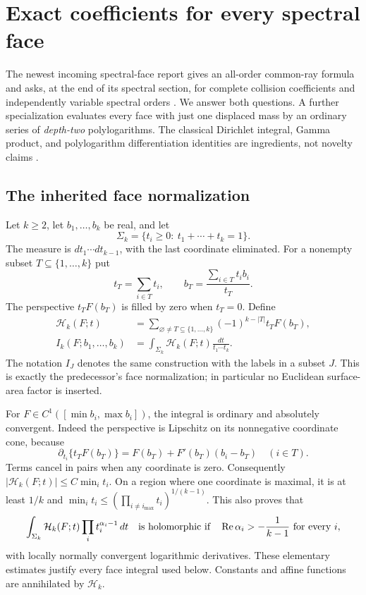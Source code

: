 \documentclass[11pt,letterpaper]{article}
\numberwithin{equation}{section}
\theoremstyle{definition}
\theoremstyle{remark}
\DeclareMathOperator{\Ree}{Re}
\begin{document}
\section{Exact coefficients for every spectral face}
\label{sfj:sec:faces}

The newest incoming spectral-face report gives an all-order common-ray
formula and asks, at the end of its spectral section, for complete
collision coefficients and independently variable spectral orders
\cite{RepoBernoulli}.  We answer both questions.  A further
specialization evaluates every face with just one displaced mass by
an ordinary series of \emph{depth-two} polylogarithms.  The classical
Dirichlet integral, Gamma product, and polylogarithm differentiation
identities are ingredients, not novelty claims
\cite{Carlson,DLMF}.

\subsection{The inherited face normalization}

Let $k\ge2$, let $b_1,\ldots,b_k$ be real, and let
\[
 \Sigma_k=\{t_i\ge0:\ t_1+\cdots+t_k=1\}.
\]
The measure is $dt_1\cdots dt_{k-1}$, with the last coordinate
eliminated.  For a nonempty subset $T\subseteq\{1,\ldots,k\}$ put
\[
 t_T=\sum_{i\in T}t_i,\qquad
 b_T=\frac{\sum_{i\in T}t_i b_i}{t_T}.
\]
The perspective $t_TF(b_T)$ is filled by zero when $t_T=0$.  Define
\begin{align}
 \mathcal H_k(F;t)&=
 \sum_{\varnothing\ne T\subseteq\{1,\ldots,k\}}
       (-1)^{k-|T|}t_TF(b_T),\label{sfj:eq:face}\\
 I_k(F;b_1,\ldots,b_k)&=
 \int_{\Sigma_k}\mathcal H_k(F;t)\frac{dt}{t_1\cdots t_k}.
 \label{sfj:eq:I}
\end{align}
The notation $I_J$ denotes the same construction with the labels in a
subset $J$.  This is exactly the predecessor's face normalization; in
particular no Euclidean surface-area factor is inserted.

For $F\in C^1([\min b_i,\max b_i])$, the integral is ordinary and
absolutely convergent.  Indeed the perspective is Lipschitz on its
nonnegative coordinate cone, because
\[
 \partial_{t_i}\{t_TF(b_T)\}
      =F(b_T)+F'(b_T)(b_i-b_T)\quad(i\in T).
\]
Terms cancel in pairs when any coordinate is zero.  Consequently
$|\mathcal H_k(F;t)|\le C\min_i t_i$.  On a region where one
coordinate is maximal, it is at least $1/k$ and
$\min_i t_i\le(\prod_{i\ne i_{\max}}t_i)^{1/(k-1)}$.
This also proves that
\begin{equation}\label{sfj:eq:normal-face-domain}
 \int_{\Sigma_k}\mathcal H_k(F;t)\prod_i t_i^{\alpha_i-1}\,dt
 \quad\hbox{is holomorphic if}\quad
 \Ree\alpha_i>-\frac1{k-1}\ \hbox{for every }i,
\end{equation}
with locally normally convergent logarithmic derivatives.  These
elementary estimates justify every face integral used below.  Constants
and affine functions are annihilated by $\mathcal H_k$.
\end{document}
